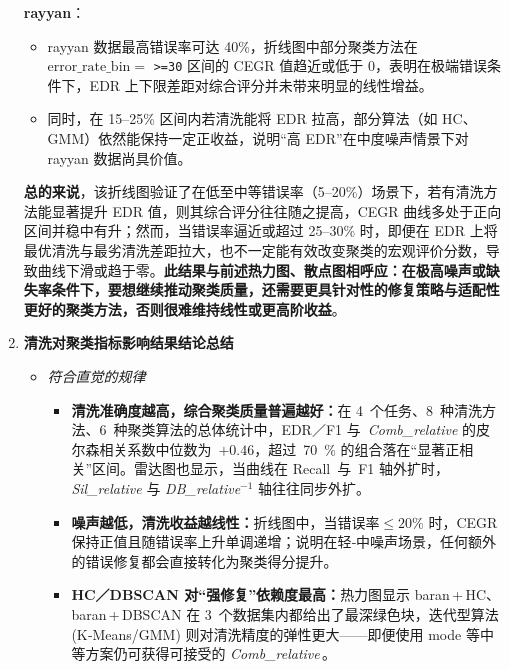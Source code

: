 \documentclass[10pt]{article} %
\numberwithin{equation}{section}
\begin{document}
\begin{enumerate}[label=(\alph*)]
\textbf{rayyan}：
    \begin{itemize}
        \item rayyan 数据最高错误率可达 40\%，折线图中部分聚类方法在 \(\mathrm{error\_rate\_bin} = \) \texttt{>=30} 区间的 CEGR 值趋近或低于 0，表明在极端错误条件下，EDR 上下限差距对综合评分并未带来明显的线性增益。
        \item 同时，在 15--25\% 区间内若清洗能将 EDR 拉高，部分算法（如 HC、GMM）依然能保持一定正收益，说明“高 EDR”在中度噪声情景下对 rayyan 数据尚具价值。
    \end{itemize}

\noindent
\textbf{总的来说}，该折线图验证了在低至中等错误率（5--20\%）场景下，若有清洗方法能显著提升 EDR 值，则其综合评分往往随之提高，CEGR 曲线多处于正向区间并稳中有升；然而，当错误率逼近或超过 25--30\% 时，即便在 EDR 上将最优清洗与最劣清洗差距拉大，也不一定能有效改变聚类的宏观评价分数，导致曲线下滑或趋于零。\textbf{此结果与前述热力图、散点图相呼应：在极高噪声或缺失率条件下，要想继续推动聚类质量，还需要更具针对性的修复策略与适配性更好的聚类方法，否则很难维持线性或更高阶收益}。  
    \item \textbf{清洗对聚类指标影响结果结论总结}\\[-0.4em]
\begin{itemize}
    \item \emph{符合直觉的规律}\\[-0.2em]
    \begin{itemize}
        \item \textbf{清洗准确度越高，综合聚类质量普遍越好：}在 4 个任务、8 种清洗方法、6 种聚类算法的总体统计中，EDR／F1 与 \textit{Comb\_relative} 的皮尔森相关系数中位数为 $+0.46$，超过 70 \% 的组合落在“显著正相关”区间。雷达图也显示，当曲线在 Recall 与 F1 轴外扩时，\textit{Sil\_relative} 与 \textit{DB\_relative}$^{-1}$ 轴往往同步外扩。  
        \item \textbf{噪声越低，清洗收益越线性：}折线图中，当错误率$\le20\%$ 时，CEGR 保持正值且随错误率上升单调递增；说明在轻‑中噪声场景，任何额外的错误修复都会直接转化为聚类得分提升。  
        \item \textbf{HC／DBSCAN 对“强修复”依赖度最高：}热力图显示 baran\,+\,HC、baran\,+\,DBSCAN 在 3 个数据集内都给出了最深绿色块，迭代型算法 (K‑Means/GMM) 则对清洗精度的弹性更大——即便使用 mode 等中等方案仍可获得可接受的 \textit{Comb\_relative}\,。  
    \end{itemize}


\end{itemize}
\end{enumerate}
\end{document}

